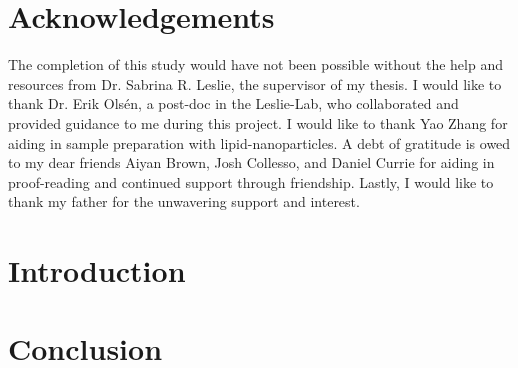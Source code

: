 \documentclass[12pt, oneside]{book}
\begin{document}
    \newpage
    \chapter*{Acknowledgements}



    The completion of this study would have not been possible without the help and resources from Dr. Sabrina R. Leslie, the supervisor of my thesis. I would like to thank Dr. Erik Olsén, a post-doc in the Leslie-Lab, who collaborated and provided guidance to me during this project. I would like to thank Yao Zhang for aiding in sample preparation with lipid-nanoparticles. A debt of gratitude is owed to my dear friends Aiyan Brown, Josh Collesso, and Daniel Currie for aiding in proof-reading and continued support through friendship. Lastly, I would like to thank my father for the unwavering support and interest.

    \chapter{Introduction}\label{chap:intro}
    


    
    
    

    

    \chapter{Conclusion}
    


    \printbibliography{}
    \appendix
    
    
    
\end{document}
